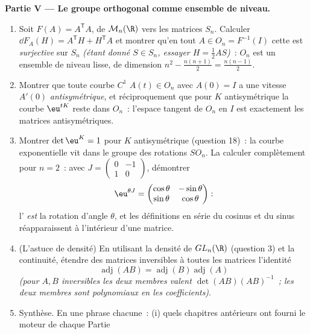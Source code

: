 \begin{problem}
\medskip
\noindent\textbf{Partie V --- Le groupe orthogonal comme ensemble de
niveau.}
\begin{enumerate}[resume]
  \item Soit $F(A) = A^{\mathsf T}A$, de $\mathcal M_n(\R)$ vers
        les matrices  $S_n$. Calculer $\dd F_A(H) =
        A^{\mathsf T}H + H^{\mathsf T}A$ et montrer qu'en tout
        $A \in O_n = F^{-1}(I)$ cette  est
        \emph{surjective} sur $S_n$ \emph{(étant donné $S \in S_n$,
        essayer $H = \frac12 AS$)}~: $O_n$ est un ensemble de niveau
        lisse, de dimension $n^2 - \frac{n(n+1)}2 = \frac{n(n-1)}2$.
  \item Montrer que toute courbe $C^1$ $A(t) \in O_n$ avec $A(0) =
        I$ a une vitesse $A'(0)$ \emph{antisymétrique}, et
        réciproquement que pour $K$ antisymétrique la courbe
        $\eu^{tK}$ reste dans $O_n$~: l'espace tangent de $O_n$
        en $I$ est exactement les matrices antisymétriques.
  \item Montrer $\det\eu^{K} = 1$ pour $K$ antisymétrique (question
        18)~: la courbe exponentielle vit dans le groupe des
        rotations $SO_n$. La calculer complètement pour $n = 2$~:
        avec $J = \begin{pmatrix}0 & -1\\ 1 & 0\end{pmatrix}$,
        démontrer
        \[
        \eu^{\theta J} = \begin{pmatrix} \cos\theta &
        -\sin\theta\\ \sin\theta & \cos\theta\end{pmatrix} :
        \]
        l' \emph{est} la rotation d'angle
        $\theta$, et les définitions en série du cosinus et du sinus
        réapparaissent à l'intérieur d'une matrice.
  \item (L'astuce de densité) En utilisant la densité de $GL_n(\R)$
        (question 3) et la continuité, étendre des matrices
        inversibles à toutes les matrices l'identité
        \[
        \operatorname{adj}(AB) =
        \operatorname{adj}(B)\operatorname{adj}(A)
        \]
        \emph{(pour $A, B$ inversibles les deux membres valent
        $\det(AB)(AB)^{-1}$~; les deux membres sont polynomiaux en
        les coefficients)}.
  \item Synthèse. En une phrase chacune~: (i) quels chapitres
        antérieurs ont fourni le moteur de chaque Partie

\end{enumerate}
\end{problem}

